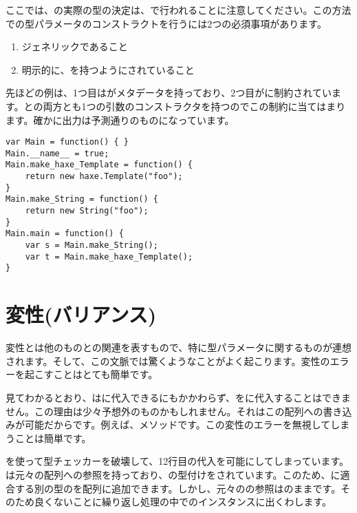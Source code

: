 
ここでは、の実際の型の決定は、で行われることに注意してください。この方法での型パラメータのコンストラクトを行うには2つの必須事項があります。

\begin{enumerate}
	\item ジェネリックであること
	\item 明示的に、を持つようにされていること
\end{enumerate}

先ほどの例は、1つ目はがメタデータを持っており、2つ目がに制約されています。との両方とも1つの引数のコンストラクタを持つのでこの制約に当てはまります。確かに出力は予測通りのものになっています。

\begin{lstlisting}
var Main = function() { }
Main.__name__ = true;
Main.make_haxe_Template = function() {
	return new haxe.Template("foo");
}
Main.make_String = function() {
	return new String("foo");
}
Main.main = function() {
	var s = Main.make_String();
	var t = Main.make_haxe_Template();
}
\end{lstlisting}

\section{変性(バリアンス)}
\label{type-system-variance}

変性とは他のものとの関連を表すもので、特に型パラメータに関するものが連想されます。そして、この文脈では驚くようなことがよく起こります。変性のエラーを起こすことはとても簡単です。


見てわかるとおり、はに代入できるにもかかわらず、をに代入することはできません。この理由は少々予想外のものかもしれません。それはこの配列への書き込みが可能だからです。例えば、メソッドです。この変性のエラーを無視してしまうことは簡単です。


を使って型チェッカーを破壊して、12行目の代入を可能にしてしまっています。は元々の配列への参照を持っており、の型付けをされています。このため、に適合する別の型のを配列に追加できます。しかし、元々のの参照はのままです。そのため良くないことに繰り返し処理の中でのインスタンスに出くわします。

